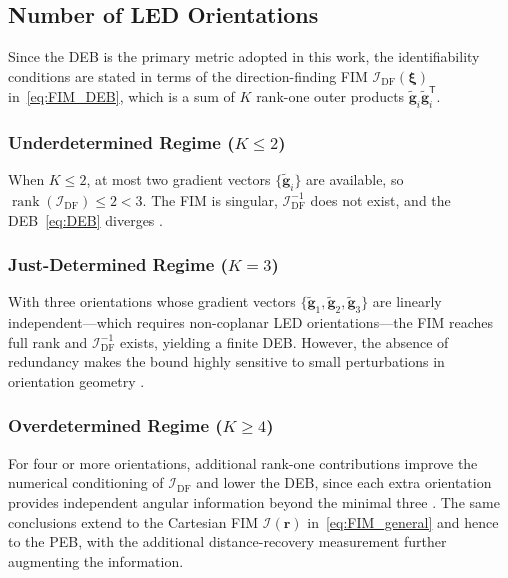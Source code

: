 \documentclass[journal]{IEEEtran}
\newcommand{\added}[1]{{\color{blue}#1}}
\begin{document}
\added{\subsection{Number of LED Orientations}
\label{subsec:Kchoice}

Since the DEB is the primary metric adopted in this work, the identifiability conditions are stated in terms of the direction-finding FIM $\mathcal{I}_{\mathrm{DF}}(\boldsymbol\xi)$ in~\eqref{eq:FIM_DEB}, which is a sum of $K$ rank-one outer products $\tilde{\mathbf g}_i\tilde{\mathbf g}_i^{\mathsf T}$.

\subsubsection{Underdetermined Regime ($K\le2$)}
When $K\le2$, at most two gradient vectors $\{\tilde{\mathbf g}_i\}$ are available, so $\operatorname{rank}(\mathcal{I}_{\mathrm{DF}})\le 2<3$. The FIM is singular, $\mathcal{I}_{\mathrm{DF}}^{-1}$ does not exist, and the DEB~\eqref{eq:DEB} diverges \cite{Zhuang2018}.

\subsubsection{Just-Determined Regime ($K=3$)}
With three orientations whose gradient vectors $\{\tilde{\mathbf g}_1,\tilde{\mathbf g}_2,\tilde{\mathbf g}_3\}$ are linearly independent---which requires non-coplanar LED orientations---the FIM reaches full rank and $\mathcal{I}_{\mathrm{DF}}^{-1}$ exists, yielding a finite DEB. However, the absence of redundancy makes the bound highly sensitive to small perturbations in orientation geometry \cite{Chen2021}.

\subsubsection{Overdetermined Regime ($K\ge4$)}
For four or more orientations, additional rank-one contributions improve the numerical conditioning of $\mathcal{I}_{\mathrm{DF}}$ and lower the DEB, since each extra orientation provides independent angular information beyond the minimal three \cite{Ma2024,Wang2024b}. The same conclusions extend to the Cartesian FIM $\mathcal{I}(\mathbf r)$ in~\eqref{eq:FIM_general} and hence to the PEB, with the additional distance-recovery measurement further augmenting the information.} 
\end{document}

